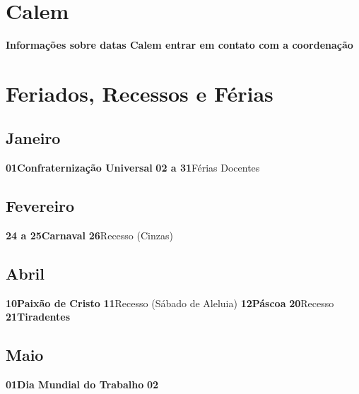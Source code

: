 \documentclass[thesis]{hmcposter}
\begin{document}
\begin{poster}
\newpage\section{\color{hmcorange}Calem}\textbf{Informações sobre datas Calem entrar em contato com a coordenação} \newpage\onespacing \small \section{\color{hmcorange}Feriados, Recessos e Férias}\subsection{Janeiro}\textbf{01}\quad \quad \quad \quad \textbf{Confraternização Universal} \newline\textbf{02 a 31}\quad \quad Férias Docentes \newline\subsection{Fevereiro}\textbf{24 a 25}\quad \quad \textbf{Carnaval} \newline\textbf{26}\quad \quad \quad \quad Recesso (Cinzas) \newline\subsection{Abril}\textbf{10}\quad \quad \quad \quad \textbf{Paixão de Cristo} \newline\textbf{11}\quad \quad \quad \quad Recesso (Sábado de Aleluia) \newline\textbf{12}\quad \quad \quad \quad \textbf{Páscoa} \newline\textbf{20}\quad \quad \quad \quad Recesso \newline\textbf{21}\quad \quad \quad \quad \textbf{Tiradentes} \newline\subsection{Maio}\textbf{01}\quad \quad \quad \quad \textbf{Dia Mundial do Trabalho} \newline\textbf{02}\quad \quad \quad \quad 
\end{poster}
\end{document}
